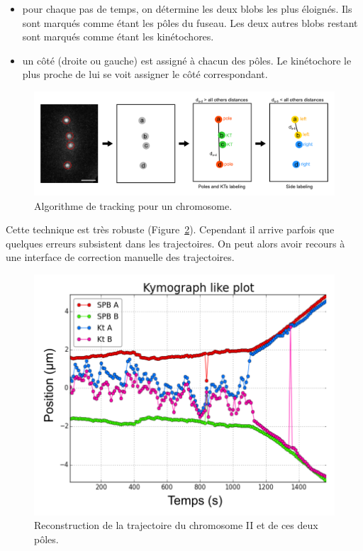 \documentclass[12pt,a4paper,twoside,openright]{book}
\begin{document}
\begin{itemize}
\item
  pour chaque pas de temps, on détermine les deux blobs les plus
  éloignés. Ils sont marqués comme étant les pôles du fuseau. Les deux
  autres blobs restant sont marqués comme étant les kinétochores.
\item
  un côté (droite ou gauche) est assigné à chacun des pôles. Le
  kinétochore le plus proche de lui se voit assigner le côté
  correspondant.
\end{itemize}

\begin{figure}[htbp]
\centering
\includegraphics{figures/results/imaging/algo_cen2.png}
\caption[Algorithme de tracking pour un chromosome]{\label{fig:algo_cen2}Algorithme
de tracking pour un chromosome.}
\end{figure}

Cette technique est très robuste (Figure~\ref{fig:cen2}). Cependant il
arrive parfois que quelques erreurs subsistent dans les trajectoires. On
peut alors avoir recours à une interface de correction manuelle des
trajectoires.

\begin{figure}[htbp]
\centering
\includegraphics{figures/results/imaging/cen2.png}
\caption[Reconstruction de la trajectoire du chromosome II et de ces deux pôles.]{\label{fig:cen2}Reconstruction
de la trajectoire du chromosome II et de ces deux pôles.}
\end{figure}
\end{document}
